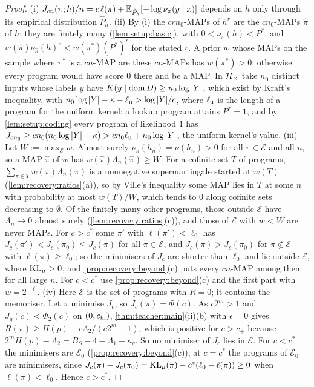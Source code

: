\begin{proof}
(i) $J_{cn}(\pi;h)/n=c\,\ell(\pi)+\mathbb{E}_{\hat P_h}[-\log\nu_\pi(y\mid x)]$ depends on $h$ only through its empirical distribution $\hat P_h$. (ii) By (i) the $crn_0$-MAPs of $h^r$ are the $cn_0$-MAPs $\hat\pi$ of $h$; they are finitely many (\cref{lem:setup:basic}), with $0<\nu_{\hat\pi}(h)<P^*$, and $w(\hat\pi)\nu_{\hat\pi}(h)^r<w(\pi^*)(P^*)^r$ for the stated $r$. A prior $w$ whose MAPs on the sample where $\pi^*$ is a $cn$-MAP are these $cn$-MAPs has $w(\pi^*)>0$: otherwise every program would have score $0$ there and be a MAP. In $\mathcal{H}_{\times}$ take $n_0$ distinct inputs whose labels $y$ have $K(y\mid\operatorname{dom} D)\ge n_0\log|Y|$, which exist by Kraft's inequality, with $n_0\log|Y|-\kappa-\ell_{\rm u}>\log|Y|/c$, where $\ell_{\rm u}$ is the length of a program for the uniform kernel: a lookup program attains $P^*=1$, and by \cref{lem:setup:coding} every program of likelihood $1$ has $J_{cn_0}\ge cn_0(n_0\log|Y|-\kappa)>cn_0\ell_{\rm u}+n_0\log|Y|$, the uniform kernel's value. (iii) Let $W:=\max_{\mathcal E}w$. Almost surely $\nu_\pi(h_n)=\nu(h_n)>0$ for all $\pi\in\mathcal E$ and all $n$, so a MAP $\hat\pi$ of $w$ has $w(\hat\pi)\Lambda_n(\hat\pi)\ge W$. For a cofinite set $T$ of programs, $\sum_{\pi\in T}w(\pi)\Lambda_n(\pi)$ is a nonnegative supermartingale started at $w(T)$ (\cref{lem:recovery:ratios}(a)), so by Ville's inequality some MAP lies in $T$ at some $n$ with probability at most $w(T)/W$, which tends to $0$ along cofinite sets decreasing to $\emptyset$. Of the finitely many other programs, those outside $\mathcal E$ have $\Lambda_n\to0$ almost surely (\cref{lem:recovery:ratios}(c)), and those of $\mathcal E$ with $w<W$ are never MAPs. For $c>c^*$ some $\pi'$ with $\ell(\pi')<\ell_0$ has $J_c(\pi')<J_c(\pi_0)\le J_c(\pi)$ for all $\pi\in\mathcal E$, and $J_c(\pi)>J_c(\pi_0)$ for $\pi\notin\mathcal E$ with $\ell(\pi)\ge\ell_0$; so the minimisers of $J_c$ are shorter than $\ell_0$ and lie outside $\mathcal E$, where $\operatorname{KL}_\mu>0$, and \cref{prop:recovery:beyond}(c) puts every $cn$-MAP among them for all large $n$. For $c<c^*$ use \cref{prop:recovery:beyond}(c) and the first part with $w=2^{-\ell}$. (iv) Here $\mathcal E$ is the set of programs with $R=0$; it contains the memoriser. Let $\pi$ minimise $J_c$, so $J_c(\pi)=\Phi(c)$. As $c2^m>1$ and $J_g(c)<\Phi_2(c)$ on $(0,c_{\rm hi})$, \cref{thm:teacher:main}(ii)(b) with $\epsilon=0$ gives $R(\pi)\ge H(p)-c\Lambda_2/(c2^m-1)$, which is positive for $c>c_+$ because $2^mH(p)-\Lambda_2=B_S-4-\Lambda_1-\kappa_g$. So no minimiser of $J_c$ lies in $\mathcal E$. For $c<c^*$ the minimisers are $\mathcal E_0$ (\cref{prop:recovery:beyond}(c)); at $c=c^*$ the programs of $\mathcal E_0$ are minimisers, since $J_c(\pi)-J_c(\pi_0)=\operatorname{KL}_\mu(\pi)-c^*(\ell_0-\ell(\pi))\ge0$ when $\ell(\pi)<\ell_0$. Hence $c>c^*$.
\end{proof}

